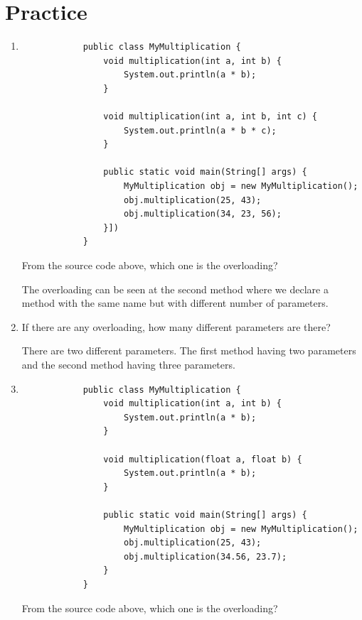 \documentclass[12pt,titlepage]{article}
\begin{document}
\section{Practice}
\begin{enumerate}
    \item {
        \begin{verbatim}
            public class MyMultiplication {
                void multiplication(int a, int b) {
                    System.out.println(a * b);
                }

                void multiplication(int a, int b, int c) {
                    System.out.println(a * b * c);
                }

                public static void main(String[] args) {
                    MyMultiplication obj = new MyMultiplication();
                    obj.multiplication(25, 43);
                    obj.multiplication(34, 23, 56);
                }])
            }
        \end{verbatim}

        From the source code above, which one is the overloading?

        The overloading can be seen at the second method where we declare a method with the same name but with different number of parameters.
    }
    \item {
        If there are any overloading, how many different parameters are there?

        There are two different parameters. The first method having two parameters and the second method having three parameters.
    }
    \item {
        \begin{verbatim}
            public class MyMultiplication {
                void multiplication(int a, int b) {
                    System.out.println(a * b);
                }

                void multiplication(float a, float b) {
                    System.out.println(a * b);
                }

                public static void main(String[] args) {
                    MyMultiplication obj = new MyMultiplication();
                    obj.multiplication(25, 43);
                    obj.multiplication(34.56, 23.7);
                }
            }
        \end{verbatim}

        From the source code above, which one is the overloading?

}
\end{enumerate}
\end{document}
